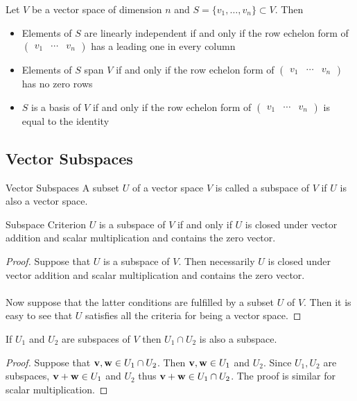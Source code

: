 \documentclass[a4paper]{article}
\begin{document}
\begin{thm}{}{} Let $V$ be a vector space of dimension $n$ and $S=\{v_1,\dots,v_n\}\subset V$. Then 
\begin{itemize}
\item Elements of $S$ are linearly independent if and only if the row echelon form of $\begin{pmatrix}v_1 & \cdots & v_n\end{pmatrix}$ has a leading one in every column
\item Elements of $S$ span $V$ if and only if the row echelon form of $\begin{pmatrix}v_1 & \cdots & v_n\end{pmatrix}$ has no zero rows
\item $S$ is a basis of $V$ if and only if the row echelon form of $\begin{pmatrix}v_1 & \cdots & v_n\end{pmatrix}$ is equal to the identity
\end{itemize}
\end{thm}

\subsection{Vector Subspaces}
\begin{defn}{Vector Subspaces}{} A subset $U$ of a vector space $V$ is called a subspace of $V$ if $U$ is also a vector space. 
\end{defn}

\begin{prp}{Subspace Criterion}{} $U$ is a subspace of $V$ if and only if $U$ is closed under vector addition and scalar multiplication and contains the zero vector. \tcbline
\begin{proof}
Suppose that $U$ is a subspace of $V$. Then necessarily $U$ is closed under vector addition and scalar multiplication and contains the zero vector. \\~\\
Now suppose that the latter conditions are fulfilled by a subset $U$ of $V$. Then it is easy to see that $U$ satisfies all the criteria for being a vector space. 
\end{proof}
\end{prp}

\begin{prp}{}{} If $U_1$ and $U_2$ are subspaces of $V$ then $U_1\cap U_2$ is also a subspace. \tcbline
\begin{proof} Suppose that $\vb{v},\vb{w}\in U_1\cap U_2$. Then $\vb{v},\vb{w}\in U_1$ and $U_2$. Since $U_1,U_2$ are subspaces, $\vb{v}+\vb{w}\in U_1$ and $U_2$ thus $\vb{v}+\vb{w}\in U_1\cap U_2$. The proof is similar for scalar multiplication. 
\end{proof}
\end{prp}
\end{document}
